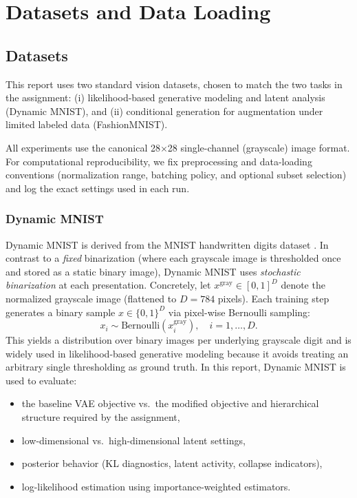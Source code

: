 
\section{Datasets and Data Loading}
\label{sec:dataset}

\subsection{Datasets}
This report uses two standard vision datasets, chosen to match the two tasks in the assignment:
(i) likelihood-based generative modeling and latent analysis (Dynamic MNIST), and
(ii) conditional generation for augmentation under limited labeled data (FashionMNIST).

All experiments use the canonical 28$\times$28 single-channel (grayscale) image format. For computational reproducibility, we fix preprocessing and data-loading conventions (normalization range, batching policy, and optional subset selection) and log the exact settings used in each run.

\subsubsection{Dynamic MNIST}
\label{subsec:dynamic_mnist}
Dynamic MNIST is derived from the MNIST handwritten digits dataset \cite{LeCun1998MNIST}. In contrast to a \emph{fixed} binarization (where each grayscale image is thresholded once and stored as a static binary image), Dynamic MNIST uses \emph{stochastic binarization} at each presentation. Concretely, let $x^{\mathrm{gray}} \in [0,1]^D$ denote the normalized grayscale image (flattened to $D=784$ pixels). Each training step generates a binary sample $x \in \{0,1\}^D$ via pixel-wise Bernoulli sampling:
\[
x_i \sim \mathrm{Bernoulli}\!\left(x^{\mathrm{gray}}_i\right), \quad i=1,\dots,D.
\]
This yields a distribution over binary images per underlying grayscale digit and is widely used in likelihood-based generative modeling because it avoids treating an arbitrary single thresholding as ground truth. In this report, Dynamic MNIST is used to evaluate:
\begin{itemize}
  \item the baseline VAE objective vs.\ the modified objective and hierarchical structure required by the assignment,
  \item low-dimensional vs.\ high-dimensional latent settings,
  \item posterior behavior (KL diagnostics, latent activity, collapse indicators),
  \item log-likelihood estimation using importance-weighted estimators.
\end{itemize}

